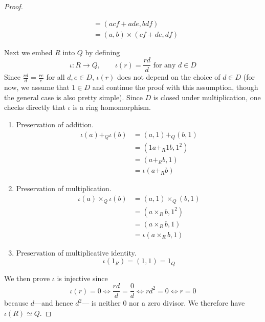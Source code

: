 \begin{proof}
\begin{enumerate}
\begin{align}
                                          & = (acf + ade, bdf) \\
                                          & = (a, b) \times (cf + de, df)
        \end{align}
    \end{enumerate}
    Next we embed $R$ into $Q$ by defining 
    \begin{equation}
      \iota: R \to Q, \qquad \iota(r) = \frac{rd}{d} \text{ for any } d \in D
    \end{equation}
    Since $\frac{rd}{d} = \frac{re}{e}$ for all $d, e \in D$, $\iota(r)$ does not depend on the choice of $d \in D$ (for now, we assume that $1 \in D$ and continue the proof with this assumption, though the general case is also pretty simple). Since $D$ is closed under multiplication, one checks directly that $\iota$ is a ring homomorphism. 
    \begin{enumerate}
      \item Preservation of addition. 
        \begin{align}
          \iota(a) +_{Q} \iota(b) & = (a, 1) +_{Q} (b, 1) \\
                                           & = (1a +_{R} 1b, 1^2) \\
                                           & = (a +_{R} b, 1) \\
                                           & = \iota(a +_{R} b) 
        \end{align}
      \item Preservation of multiplication. 
        \begin{align}
          \iota(a) \times_{Q} \iota(b) & = (a, 1) \times_{Q} (b, 1) \\
                                                & = (a \times_{R} b, 1^2) \\
                                                & = (a \times_{R} b, 1) \\
                                                & = \iota(a \times_{R} b, 1)
        \end{align}
      \item Preservation of multiplicative identity. 
        \begin{equation}
          \iota(1_{R}) = (1, 1) = 1_{Q}
        \end{equation}
    \end{enumerate}
    We then prove $\iota$ is injective since 
    \begin{equation}
      \iota(r) = 0 \iff \frac{rd}{d} = \frac{0}{d} \iff rd^2 = 0 \iff r = 0
    \end{equation}
    because $d$---and hence $d^2$--- is neither $0$ nor a zero divisor. We therefore have $\iota(R) \simeq Q$. 


\end{proof}
